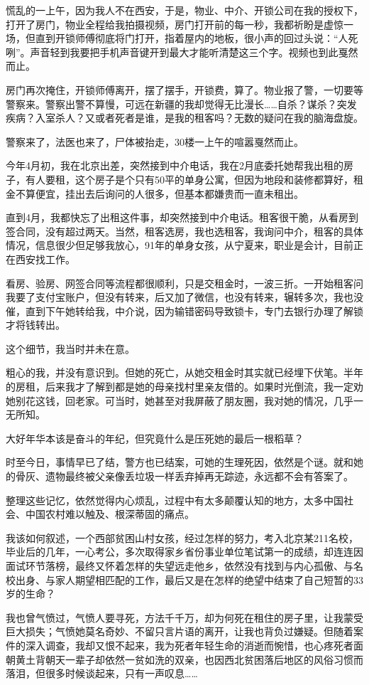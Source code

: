 慌乱的一上午，因为我人不在西安，于是，物业、中介、开锁公司在我的授权下，打开了房门，物业全程给我拍摄视频，房门打开前的每一秒，我都祈盼是虚惊一场，但直到开锁师傅彻底将门打开，指着屋内的地板，很小声的回过头说：“人死咧”。声音轻到我要把手机声音键开到最大才能听清楚这三个字。视频也到此戛然而止。

房门再次掩住，开锁师傅离开，摆了摆手，开锁费，算了。物业报了警，一切要等警察来。警察出警不算慢，可远在新疆的我却觉得无比漫长……自杀？谋杀？突发疾病？入室杀人？又或者死者是谁，是我的租客吗？无数的疑问在我的脑海盘旋。

警察来了，法医也来了，尸体被抬走，30楼一上午的喧嚣戛然而止。

今年4月初，我在北京出差，突然接到中介电话，我在2月底委托她帮我出租的房子，有人要租，这个房子是个只有50平的单身公寓，但因为地段和装修都算好，租金不算便宜，挂出去后询问的人很多，但基本都嫌贵而一直未租出。

直到4月，我都快忘了出租这件事，却突然接到中介电话。租客很干脆，从看房到签合同，没有超过两天。当然，租客选房，我也选租客，我询问中介，租客的具体情况，信息很少但足够我放心，91年的单身女孩，从宁夏来，职业是会计，目前正在西安找工作。

看房、验房、网签合同等流程都很顺利，只是交租金时，一波三折。一开始租客问我要了支付宝账户，但没有转来，后又加了微信，也没有转来，辗转多次，我也没催，直到下午她转给我，中介说，因为输错密码导致锁卡，专门去银行办理了解锁才将钱转出。

这个细节，我当时并未在意。

粗心的我，并没有意识到。但她的死亡，从她交租金时其实就已经埋下伏笔。半年的房租，后来我才了解到都是她的母亲找村里亲友借的。如果时光倒流，我一定劝她别花这钱，回老家。可当时，她甚至对我屏蔽了朋友圈，我对她的情况，几乎一无所知。

大好年华本该是奋斗的年纪，但究竟什么是压死她的最后一根稻草？

时至今日，事情早已了结，警方也已结案，可她的生理死因，依然是个谜。就和她的骨灰、遗物最终被父亲像丢垃圾一样丢弃掉再无踪迹，永远都不会有答案了。

整理这些记忆，依然觉得内心烦乱，过程中有太多颠覆认知的地方，太多中国社会、中国农村难以触及、根深蒂固的痛点。

我该如何叙述，一个西部贫困山村女孩，经过怎样的努力，考入北京某211名校，毕业后的几年，一心考公，多次取得家乡省份事业单位笔试第一的成绩，却连连因面试环节落榜，最终又怀着怎样的失望远走他乡，依然没有找到与内心孤傲、与名校出身、与家人期望相匹配的工作，最后又是在怎样的绝望中结束了自己短暂的33岁的生命？

我也曾气愤过，气愤人要寻死，方法千千万，却为何死在租住的房子里，让我蒙受巨大损失；气愤她莫名奇妙、不留只言片语的离开，让我也背负过嫌疑。但随着案件的深入调查，我却又恨不起来，我为死者年轻生命的消逝而惋惜，也心疼死者面朝黄土背朝天一辈子却依然一贫如洗的双亲，也因西北贫困落后地区的风俗习惯而落泪，但很多时候谈起来，只有一声叹息……


